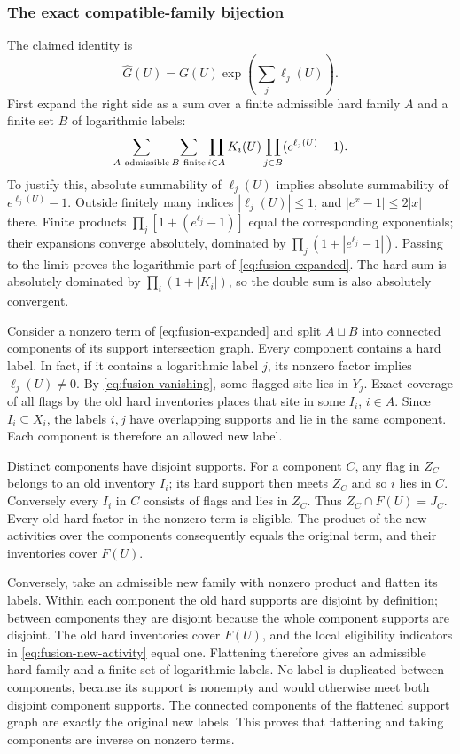\subsubsection{The exact compatible-family bijection}
The claimed identity is
\begin{equation}\label{eq:fusion-gas-identity}
                     \widehat G(U)=G(U)\exp\left(\sum_j\ell_j(U)\right).
\end{equation}
First expand the right side as a sum over a finite admissible hard
family $A$ and a finite set $B$ of logarithmic labels:
\begin{equation}\label{eq:fusion-expanded}
               \sum_{A\ {\rm admissible}}\sum_{B\ {\rm finite}}
                    \prod_{i\in A}K_i(U)\prod_{j\in B}(e^{\ell_j(U)}-1).
\end{equation}
To justify this, absolute summability of $\ell_j(U)$ implies absolute
summability of $e^{\ell_j(U)}-1$. Outside finitely many indices
$|\ell_j(U)|\le1$, and $|e^x-1|\le2|x|$ there. Finite products
$\prod_j[1+(e^{\ell_j}-1)]$ equal the corresponding exponentials;
their expansions converge absolutely, dominated by
$\prod_j(1+|e^{\ell_j}-1|)$. Passing to the limit proves the
logarithmic part of \eqref{eq:fusion-expanded}. The hard sum is
absolutely dominated by $\prod_i(1+|K_i|)$, so the double sum is
also absolutely convergent.

Consider a nonzero term of \eqref{eq:fusion-expanded} and split
$A\sqcup B$ into connected components of its support intersection
graph. Every component contains a hard label. In fact, if it contains
a logarithmic label $j$, its nonzero factor implies $\ell_j(U)\ne0$.
By \eqref{eq:fusion-vanishing}, some flagged site lies in $Y_j$.
Exact coverage of all flags by the old hard inventories places that
site in some $I_i$, $i\in A$. Since $I_i\subseteq X_i$, the labels
$i,j$ have overlapping supports and lie in the same component.
Each component is therefore an allowed new label.

Distinct components have disjoint supports. For a component $C$,
any flag in $Z_C$ belongs to an old inventory $I_i$; its hard support
then meets $Z_C$ and so $i$ lies in $C$. Conversely every $I_i$ in
$C$ consists of flags and lies in $Z_C$. Thus $Z_C\cap F(U)=J_C$.
Every old hard factor in the nonzero term is eligible. The product
of the new activities over the components consequently equals the
original term, and their inventories cover $F(U)$.

Conversely, take an admissible new family with nonzero product and
flatten its labels. Within each component the old hard supports
are disjoint by definition; between components they are disjoint
because the whole component supports are disjoint. The old hard
inventories cover $F(U)$, and the local eligibility indicators in
\eqref{eq:fusion-new-activity} equal one. Flattening therefore gives
an admissible hard family and a finite set of logarithmic labels.
No label is duplicated between components, because its support is
nonempty and would otherwise meet both disjoint component supports.
The connected components of the flattened support graph are exactly
the original new labels. This proves that flattening and taking
components are inverse on nonzero terms.

